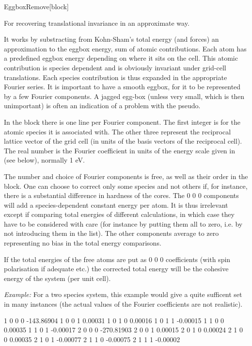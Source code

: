 \begin{fdfentry}{EggboxRemove}[block]

  For recovering translational invariance in an approximate way.

  It works by substracting from Kohn-Sham's total energy (and forces)
  an approximation to the eggbox energy, sum of atomic contributions.
  Each atom has a predefined eggbox energy depending on where it sits
  on the cell. This atomic contribution is species dependent and is
  obviously invariant under grid-cell translations. Each species
  contribution is thus expanded in the appropriate Fourier series.  It
  is important to have a smooth eggbox, for it to be represented by a
  few Fourier components. A jagged egg-box (unless very small, which
  is then unimportant) is often an indication of a problem with the
  pseudo.

  In the block there is one line per Fourier component. The first
  integer is for the atomic species it is associated with. The other
  three represent the reciprocal lattice vector of the grid cell (in
  units of the basis vectors of the reciprocal cell). The real number
  is the Fourier coefficient in units of the energy scale given in
   (see below), normally 1 eV.

  The number and choice of Fourier components is free, as well as
  their order in the block. One can choose to correct only some
  species and not others if, for instance, there is a substantial
  difference in hardness of the cores. The 0 0 0 components will add a
  species-dependent constant energy per atom. It is thus irrelevant
  except if comparing total energies of different calculations, in
  which case they have to be considered with care (for instance by
  putting them all to zero, i.e. by not introducing them in the list).
  The other components average to zero representing no bias in the
  total energy comparisons.

  If the total energies of the free atoms are put as 0 0 0
  coefficients (with spin polarisation if adequate etc.) the corrected
  total energy will be the cohesive energy of the system (per unit
  cell).

  \emph{Example:} For a two species system, this example would give a
  quite sufficent set in many instances (the actual values of the
  Fourier coefficients are not realistic).
  \begin{fdfexample}
       1   0   0   0 -143.86904
       1   0   0   1    0.00031
       1   0   1   0    0.00016
       1   0   1   1   -0.00015
       1   1   0   0    0.00035
       1   1   0   1   -0.00017
       2   0   0   0 -270.81903
       2   0   0   1    0.00015
       2   0   1   0    0.00024
       2   1   0   0    0.00035
       2   1   0   1   -0.00077
       2   1   1   0   -0.00075
       2   1   1   1   -0.00002
  \end{fdfexample}


\end{fdfentry}
